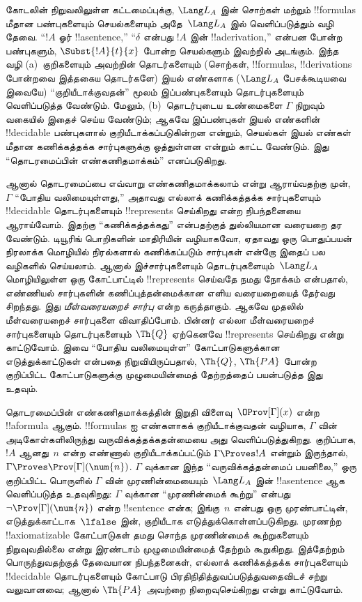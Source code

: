 \documentclass[../../../include/open-logic-section]{subfiles}
\begin{document}
கோடலின் நிறுவலிலுள்ள கட்டமைப்புக்கு, $\Lang L_A$ இன் சொற்கள் மற்றும்
!!{formula}s மீதான பண்புகளையும் செயல்களையும் அதே~$\Lang L_A$ இல்
வெளிப்படுத்தும் வழி தேவை. ``$!A$ ஓர் !!a{sentence},'' ``$\delta$ என்பது
$!A$ இன் !!a{derivation},'' என்பன போன்ற பண்புகளும்,
$\Subst{!A}{t}{x}$ போன்ற செயல்களும் இவற்றில் அடங்கும். இந்த வழி
(a)~குறிகளையும் அவற்றின் தொடர்களையும் (சொற்கள், !!{formula}s,
!!{derivation}s போன்றவை இத்தகைய தொடர்களே) இயல் எண்களாக ($\Lang L_A$
பேசக்கூடியவை இவையே) ``குறியீடாக்குவதன்'' மூலம் இப்பண்புகளையும்
தொடர்புகளையும் வெளிப்படுத்த வேண்டும். மேலும், (b)~தொடர்புடைய உண்மைகளை
$\Gamma$ நிறுவும் வகையில் இதைச் செய்ய வேண்டும்; ஆகவே இப்பண்புகள் இயல்
எண்களின் !!{decidable} பண்புகளால் குறியீடாக்கப்படுகின்றன என்றும், செயல்கள்
இயல் எண்கள் மீதான கணிக்கத்தக்க சார்புகளுக்கு ஒத்துள்ளன என்றும் காட்ட
வேண்டும். இது ``தொடரமைப்பின் எண்கணிதமாக்கம்'' எனப்படுகிறது.

ஆனால் தொடரமைப்பை எவ்வாறு எண்கணிதமாக்கலாம் என்று ஆராய்வதற்கு முன்,
$\Gamma$ ``போதிய வலிமையுள்ளது,'' அதாவது எல்லாக் கணிக்கத்தக்க சார்புகளையும்
!!{decidable} தொடர்புகளையும் !!{represents} செய்கிறது என்ற நிபந்தனையை
ஆராய்வோம். இதற்கு ``கணிக்கத்தக்கது'' என்பதற்குத் துல்லியமான வரையறை தர
வேண்டும். டியூரிங் பொறிகளின் மாதிரியின் வழியாகவோ, ஏதாவது ஒரு பொதுப்பயன்
நிரலாக்க மொழியில் நிரல்களால் கணிக்கப்படும் சார்புகள் என்றோ இதைப் பல
வழிகளில் செய்யலாம். ஆனால் இச்சார்புகளையும் தொடர்புகளையும்~$\Lang L_A$
மொழியிலுள்ள ஒரு கோட்பாட்டில் !!{represents} செய்வதே நமது நோக்கம் என்பதால்,
எண்ணியல் சார்புகளின் கணிப்புத்தன்மைக்கான எளிய வரையறையைத் தேர்வது சிறந்தது.
இது \emph{மீள்வரையறைச் சார்பு} என்ற கருத்தாகும். ஆகவே முதலில்
மீள்வரையறைச் சார்புகளை விவாதிப்போம். பின்னர் எல்லா மீள்வரையறைச்
சார்புகளையும் தொடர்புகளையும் $\Th{Q}$ ஏற்கெனவே !!{represents} செய்கிறது
என்று காட்டுவோம். இவை ``போதிய வலிமையுள்ள'' கோட்பாடுகளுக்கான எடுத்துக்காட்டுகள்
என்பதை நிறுவியிருப்பதால், $\Th{Q}$, $\Th{PA}$ போன்ற குறிப்பிட்ட
கோட்பாடுகளுக்கு முழுமையின்மைத் தேற்றத்தைப் பயன்படுத்த இது உதவும்.

தொடரமைப்பின் எண்கணிதமாக்கத்தின் இறுதி விளைவு~$\OProv[\Gamma](x)$ என்ற
!!a{formula} ஆகும். !!{formula}s ஐ எண்களாகக் குறியீடாக்குவதன் வழியாக,
$\Gamma$ வின் அடிகோள்களிலிருந்து வருவிக்கத்தக்கதன்மையை அது வெளிப்படுத்துகிறது.
குறிப்பாக, $!A$ ஆனது~$n$ என்ற எண்ணால் குறியீடாக்கப்பட்டும் $\Gamma \Proves
!A$ என்றும் இருந்தால், $\Gamma \Proves \Prov[\Gamma](\num{n})$.
$\Gamma$ வுக்கான இந்த ``வருவிக்கத்தன்மைப் பயனிலை,'' ஒரு குறிப்பிட்ட
பொருளில் $\Gamma$ வின் முரணின்மையையும்~$\Lang L_A$ இன் !!a{sentence} ஆக
வெளிப்படுத்த உதவுகிறது: $\Gamma$ வுக்கான ``முரணின்மைக் கூற்று'' என்பது
$\lnot \Prov[\Gamma](\num{n})$ என்ற !!{sentence} என்க; இங்கு~$n$ என்பது
ஒரு முரண்பாட்டின், எடுத்துக்காட்டாக~$\lfalse$ இன், குறியீடாக எடுத்துக்கொள்ளப்படுகிறது.
முரணற்ற !!{axiomatizable} கோட்பாடுகள் தமது சொந்த முரணின்மைக் கூற்றுகளையும்
நிறுவுவதில்லை என்று இரண்டாம் முழுமையின்மைத் தேற்றம் கூறுகிறது. இத்தேற்றம்
பொருந்துவதற்குத் தேவையான நிபந்தனைகள், எல்லாக் கணிக்கத்தக்க சார்புகளையும்
!!{decidable} தொடர்புகளையும் கோட்பாடு பிரதிநிதித்துவப்படுத்துவதைவிடச் சற்று
வலுவானவை; ஆனால் $\Th{PA}$ அவற்றை நிறைவுசெய்கிறது என்று காட்டுவோம்.
\end{document}
